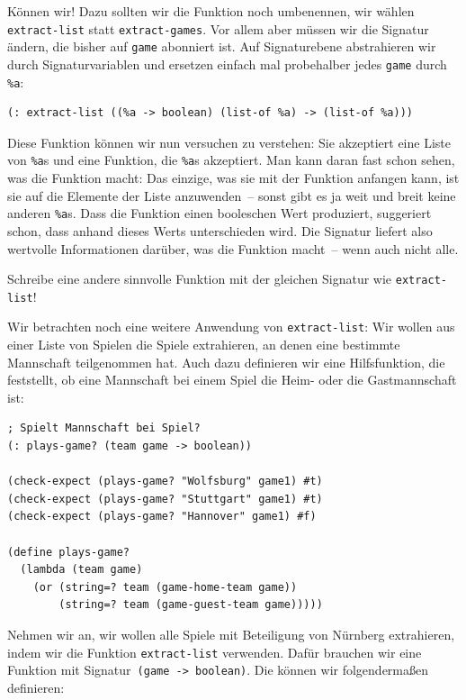 Können wir! Dazu sollten wir die Funktion noch umbenennen, wir wählen
\lstinline{extract-list} statt \lstinline{extract-games}.  Vor allem
aber müssen wir die Signatur ändern, die bisher auf \lstinline{game}
abonniert ist.  Auf Signaturebene abstrahieren wir durch
Signaturvariablen und ersetzen einfach mal probehalber jedes
\lstinline{game} durch \lstinline{%a}:
%
\begin{lstlisting}
(: extract-list ((%a -> boolean) (list-of %a) -> (list-of %a)))
\end{lstlisting}
%
Diese Funktion können wir nun versuchen zu verstehen: Sie akzeptiert
eine Liste von \lstinline{%a}s und eine Funktion, die \lstinline{%a}s
akzeptiert.  Man kann daran fast schon sehen, was die Funktion macht:
Das einzige, was sie mit der Funktion anfangen kann, ist sie auf die
Elemente der Liste anzuwenden~-- sonst gibt es ja weit und breit keine
anderen \lstinline{%a}s.  Dass die Funktion einen booleschen Wert
produziert, suggeriert schon, dass anhand dieses Werts unterschieden
wird.  Die Signatur liefert also wertvolle Informationen darüber, was
die Funktion macht~-- wenn auch nicht alle.
%
\begin{aufgabeinline}
  Schreibe eine andere sinnvolle Funktion mit der gleichen Signatur
  wie \lstinline{extract-list}!
\end{aufgabeinline}
%
Wir betrachten noch eine weitere Anwendung von
\lstinline{extract-list}: Wir wollen aus einer Liste von Spielen die
Spiele extrahieren, an denen eine bestimmte Mannschaft teilgenommen
hat.  Auch dazu definieren wir eine Hilfsfunktion, die feststellt, ob
eine Mannschaft bei einem Spiel die Heim- oder die Gastmannschaft ist:\label{func:plays-game}
%
\begin{lstlisting}
; Spielt Mannschaft bei Spiel?
(: plays-game? (team game -> boolean))

(check-expect (plays-game? "Wolfsburg" game1) #t)
(check-expect (plays-game? "Stuttgart" game1) #t)
(check-expect (plays-game? "Hannover" game1) #f)

(define plays-game?
  (lambda (team game)
    (or (string=? team (game-home-team game))
        (string=? team (game-guest-team game)))))
\end{lstlisting}
%
Nehmen wir an, wir wollen alle Spiele mit Beteiligung von Nürnberg
extrahieren, indem wir die Funktion \lstinline{extract-list}
verwenden.  Dafür brauchen wir eine Funktion mit
Signatur~\lstinline{(game -> boolean)}.  Die können wir folgendermaßen
definieren:
%
